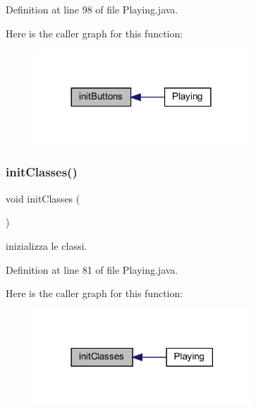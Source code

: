 Definition at line 98 of file Playing.\+java.

Here is the caller graph for this function\+:\nopagebreak
\begin{figure}[H]
\begin{center}
\leavevmode
\includegraphics[width=228pt]{classscenes_1_1_playing_a27d3ba5afb772cc36c9a432c28975ace_icgraph}
\end{center}
\end{figure}
\mbox{\label{classscenes_1_1_playing_afe125d345675ffefe8da7e96d39773f3}} 
\subsubsection{\texorpdfstring{init\+Classes()}{initClasses()}}
{\footnotesize\ttfamily void init\+Classes (\begin{DoxyParamCaption}{ }\end{DoxyParamCaption})}



inizializza le classi. 



Definition at line 81 of file Playing.\+java.

Here is the caller graph for this function\+:\nopagebreak
\begin{figure}[H]
\begin{center}
\leavevmode
\includegraphics[width=230pt]{classscenes_1_1_playing_afe125d345675ffefe8da7e96d39773f3_icgraph}
\end{center}
\end{figure}
\mbox{\label{classscenes_1_1_playing_a45d56bd84238e8b56589dfc732e2b2cf}} 
